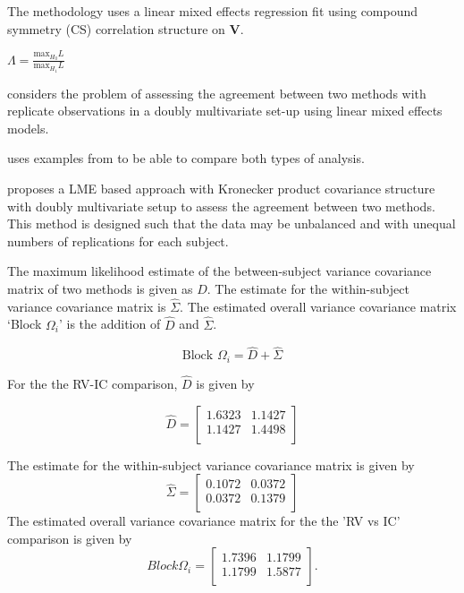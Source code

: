 \documentclass[12pt, a4paper]{report}
\theoremstyle{plain}
\theoremstyle{definition}
\theoremstyle{remark}
\begin{document}
	The methodology uses a linear mixed effects regression fit using
	compound symmetry (CS) correlation structure on \textbf{V}.
	
	
	$\Lambda = \frac{\mbox{max}_{H_{0}}L}{\mbox{max}_{H_{1}}L}$
	
	\newpage
	
	\citet{AARoy20092009} considers the problem of assessing the agreement
	between two methods with replicate observations in a doubly
	multivariate set-up using linear mixed effects models.
	
	\citet{AARoy20092009} uses examples from \citet{BA86} to be able to
	compare both types of analysis.
	
	\citet{AARoy20092009} proposes a LME based approach with Kronecker
	product covariance structure with doubly multivariate setup to
	assess the agreement between two methods. This method is designed
	such that the data may be unbalanced and with unequal numbers of
	replications for each subject.
	
	The maximum likelihood estimate of the between-subject variance
	covariance matrix of two methods is given as $D$. The estimate for
	the within-subject variance covariance matrix is $\hat{\Sigma}$.
	The estimated overall variance covariance matrix `Block
	$\Omega_{i}$' is the addition of $\hat{D}$ and $\hat{\Sigma}$.
	
	
	\begin{equation}
	\mbox{Block  }\Omega_{i} = \hat{D} + \hat{\Sigma}
	\end{equation}
	
	For the the RV-IC comparison, $\hat{D}$ is given by
	
	
	\begin{equation}
	\hat{D}= \left[ \begin{array}{cc}
	1.6323 & 1.1427  \\
	1.1427 & 1.4498 \\
	\end{array} \right]
	\end{equation}
	
	The estimate for the within-subject variance covariance matrix is
	given by
	\begin{equation}
	\hat{\Sigma}= \left[ \begin{array}{cc}
	0.1072 & 0.0372  \\
	0.0372 & 0.1379  \\
	\end{array}\right]
	\end{equation}
	The estimated overall variance covariance matrix for the the 'RV
	vs IC' comparison is given by
	\begin{equation}
	Block \Omega_{i}= \left[ \begin{array}{cc}
	1.7396 & 1.1799  \\
	1.1799 & 1.5877  \\
	\end{array} \right].
	\end{equation}
	
\end{document}
